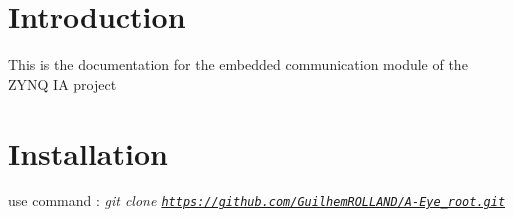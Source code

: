\hypertarget{index_intro_sec}{}\section{Introduction}\label{index_intro_sec}
This is the documentation for the embedded communication module of the Z\+Y\+NQ IA project\hypertarget{index_install}{}\section{Installation}\label{index_install}
use command \+: {\itshape  git clone \href{https://github.com/GuilhemROLLAND/A-Eye_root.git}{\tt https\+://github.\+com/\+Guilhem\+R\+O\+L\+L\+A\+N\+D/\+A-\/\+Eye\+\_\+root.\+git} } 